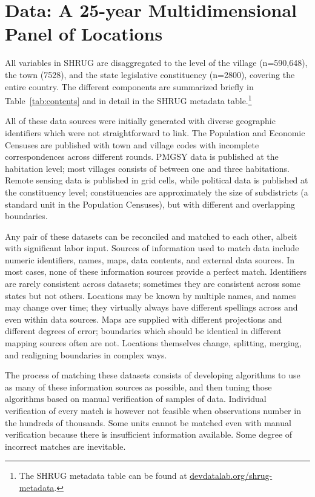 \documentclass[12pt,letterpaper]{article}
\begin{document}
\section{Data: A 25-year Multidimensional Panel of Locations}
\label{sec:data}

All variables in SHRUG are disaggregated to the level of the village
(n=590,648), the town (7528), and the state legislative constituency
(n=2800), covering the entire country. The different components are
summarized briefly in Table~\ref{tab:contents} and in detail in the
SHRUG metadata table.\footnote{The SHRUG metadata table can be found
  at
  \href{devdatalab.org/shrug-metadata}{devdatalab.org/shrug-metadata}.}

All of these data sources were initially generated with diverse
geographic identifiers which were not straightforward to link. The
Population and Economic Censuses are published with town and village
codes with incomplete correspondences across different rounds. PMGSY
data is published at the habitation level; most villages consists of
between one and three habitations. Remote sensing data is published in
grid cells, while political data is published at the constituency
level; constituencies are approximately the size of subdistricts (a
standard unit in the Population Censuses), but with different and
overlapping boundaries.

Any pair of these datasets can be reconciled and matched to each
other, albeit with significant labor input. Sources of information
used to match data include numeric identifiers, names, maps, data
contents, and external data sources. In most cases, none of these
information sources provide a perfect match. Identifiers are rarely
consistent across datasets; sometimes they are consistent across some
states but not others. Locations may be known by multiple names, and
names may change over time; they virtually always have different
spellings across and even within data sources. Maps are supplied with
different projections and different degrees of error; boundaries which
should be identical in different mapping sources often are
not. Locations themselves change, splitting, merging, and realigning
boundaries in complex ways.

The process of matching these datasets consists of developing
algorithms to use as many of these information sources as possible,
and then tuning those algorithms based on manual verification of
samples of data. Individual verification of every match is however not
feasible when observations number in the hundreds of thousands. Some
units cannot be matched even with manual verification because there is
insufficient information available. Some degree of incorrect matches
are inevitable.
\end{document}

